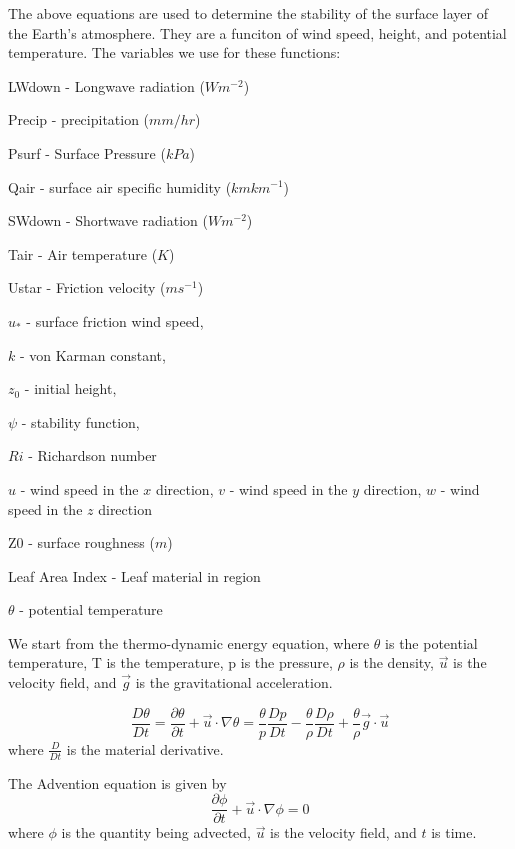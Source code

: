 \documentclass{article}
\begin{document}
The above equations are used to determine the stability of the surface layer of the Earth's atmosphere. They are a funciton of wind speed, height, and potential temperature.
The variables we use for these functions:

\begin{list}{}{}
\item LWdown - Longwave radiation ($W m^{-2}$)
\item Precip - precipitation ($mm/hr$)
\item Psurf - Surface Pressure ($kPa$)
\item Qair - surface air specific humidity ($km km^{-1}$)
\item SWdown - Shortwave radiation ($W m^{-2}$)
\item Tair - Air temperature ($K$)
\item Ustar - Friction velocity ($m s^{-1}$) 
\item $u_{*}$ - surface friction wind speed, 
\item $k$ - von Karman constant, 
\item $z_{0}$ - initial height, 
\item $\psi$ - stability function, 
\item $Ri$ - Richardson number
\item $u$ - wind speed in the $x$ direction, $v$ - wind speed in the $y$ direction, $w$ - wind speed in the $z$ direction
\item Z0 - surface roughness ($m$)
\item Leaf Area Index - Leaf material in region
\item $\theta$ - potential temperature
\end{list}

We start from the thermo-dynamic energy equation, where $\theta$ is the potential temperature, T is the temperature, p is the pressure, $\rho$ is the density, $\vec{u}$ is the velocity field, and $\vec{g}$ is the gravitational acceleration.

\begin{equation}
\frac{D \theta}{D t} = \frac{\partial \theta}{\partial t} + \vec{u} \cdot \nabla \theta = \frac{\theta}{p} \frac{D p}{D t} - \frac{\theta}{\rho} \frac{D \rho}{D t} + \frac{\theta}{\rho} \vec{g} \cdot \vec{u}
\end{equation}
where $\frac{D}{D t}$ is the material derivative.

The Advention equation is given by
\begin{equation}
\frac{\partial \phi}{\partial t} + \vec{u} \cdot \nabla \phi = 0
\end{equation}
where $\phi$ is the quantity being advected, $\vec{u}$ is the velocity field, and $t$ is time.
\end{document}
